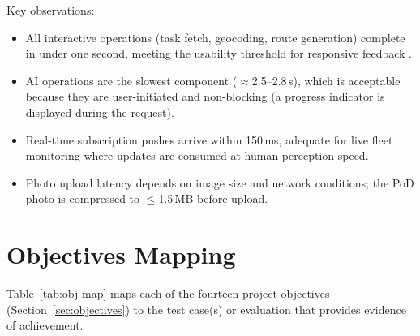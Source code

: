 Key observations:

\begin{itemize}
  \item All interactive operations (task fetch, geocoding, route generation)
        complete in under one second, meeting the usability threshold for
        responsive feedback \autocite{nielsen1993usability}.
  \item AI operations are the slowest component ($\approx$2.5–2.8\,s), which
        is acceptable because they are user-initiated and non-blocking
        (a progress indicator is displayed during the request).
  \item Real-time subscription pushes arrive within 150\,ms, adequate for
        live fleet monitoring where updates are consumed at human-perception
        speed.
  \item Photo upload latency depends on image size and network conditions;
        the PoD photo is compressed to $\leq$1.5\,MB before upload.
\end{itemize}

\section{Objectives Mapping}
\label{sec:obj-map}

Table~\ref{tab:obj-map} maps each of the fourteen project objectives
(Section~\ref{sec:objectives}) to the test case(s) or evaluation that provides
evidence of achievement.

